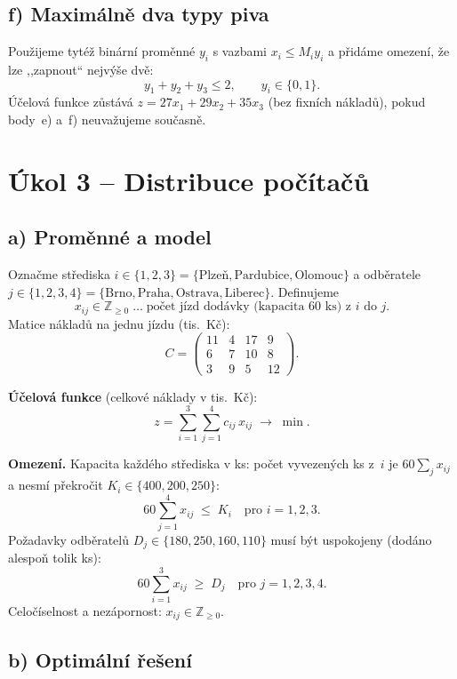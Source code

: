 \documentclass[11pt,a4paper]{article}
\begin{document}
	\subsection*{f) Maximálně dva typy piva}
	
	Použijeme tytéž binární proměnné $y_i$ s vazbami $x_i\le M_i y_i$ a přidáme omezení, že lze ,,zapnout`` nejvýše dvě:
	\[
	y_1 + y_2 + y_3 \leq 2,\qquad y_i\in\{0,1\}.
	\]
	Účelová funkce zůstává $z=27x_1+29x_2+35x_3$ (bez fixních nákladů), pokud body~e) a~f) neuvažujeme současně.
	
	\section*{Úkol 3 -- Distribuce počítačů}
	
	\subsection*{a) Proměnné a model}
	
	Označme střediska $i\in\{1,2,3\}=\{\text{Plzeň},\text{Pardubice},\text{Olomouc}\}$ a odběratele $j\in\{1,2,3,4\}=\{\text{Brno},\text{Praha},\text{Ostrava},\text{Liberec}\}$. Definujeme
	\[
	x_{ij}\in\mathbb{Z}_{\geq 0} \;\dots\; \text{počet jízd dodávky (kapacita 60 ks) z~}i\text{ do~}j.
	\]
	Matice nákladů na jednu jízdu (tis.\ Kč):
	\[
	C=\begin{pmatrix}11&4&17&9\\6&7&10&8\\3&9&5&12\end{pmatrix}.
	\]
	
	\textbf{Účelová funkce} (celkové náklady v tis.\ Kč):
	\[
	z=\sum_{i=1}^{3}\sum_{j=1}^{4} c_{ij}\,x_{ij}\;\to\;\min.
	\]
	
	\textbf{Omezení.} Kapacita každého střediska v ks: počet vyvezených ks z~$i$ je $60\sum_j x_{ij}$ a nesmí překročit $K_i\in\{400,200,250\}$:
	\[
	60\sum_{j=1}^{4} x_{ij} \;\leq\; K_i \quad \text{pro } i=1,2,3.
	\]
	Požadavky odběratelů $D_j\in\{180,250,160,110\}$ musí být uspokojeny (dodáno alespoň tolik ks):
	\[
	60\sum_{i=1}^{3} x_{ij} \;\geq\; D_j \quad \text{pro } j=1,2,3,4.
	\]
	Celočíselnost a nezápornost: $x_{ij}\in\mathbb{Z}_{\geq 0}$.
	
	\subsection*{b) Optimální řešení}
	
\end{document}
